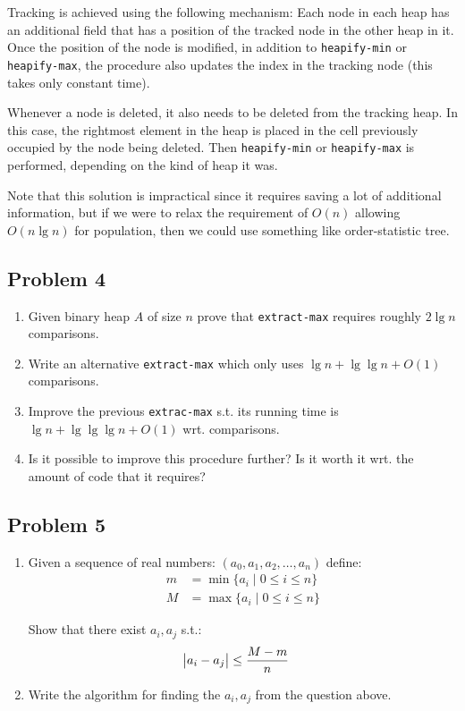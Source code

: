 \documentclass[11pt]{article}
\begin{document}
Tracking is achieved using the following mechanism: Each node in each heap
has an additional field that has a position of the tracked node in the other
heap in it.  Once the position of the node is modified, in addition to
\texttt{heapify-min} or \texttt{heapify-max}, the procedure also updates the index in the
tracking node (this takes only constant time).

Whenever a node is deleted, it also needs to be deleted from the tracking
heap.  In this case, the rightmost element in the heap is placed in the cell
previously occupied by the node being deleted.  Then \texttt{heapify-min} or
\texttt{heapify-max} is performed, depending on the kind of heap it was.

Note that this solution is impractical since it requires saving a lot of
additional information, but if we were to relax the requirement of \(O(n)\)
allowing \(O(n \lg n)\) for population, then we could use something like
order-statistic tree.

\subsection{Problem 4}
\label{sec:orgheadline5}
\begin{enumerate}
\item Given binary heap \(A\) of size \(n\) prove that \texttt{extract-max} requires
roughly \(2\lg n\) comparisons.
\item Write an alternative \texttt{extract-max} which only uses \(\lg n + \lg \lg n +
      O(1)\) comparisons.
\item Improve the previous \texttt{extrac-max} s.t. its running time is \(\lg n + \lg
      \lg \lg n + O(1)\) wrt. comparisons.
\item Is it possible to improve this procedure further?  Is it worth it wrt. the
amount of code that it requires?
\end{enumerate}

\subsection{Problem 5}
\label{sec:orgheadline8}
\begin{enumerate}
\item Given a sequence of real numbers: \((a_0, a_1, a_2, \dots, a_n)\) define:
\begin{align*}
  m &= \min\{a_i\;|\; 0 \leq i \leq n\} \\
  M &= \max\{a_i\;|\; 0 \leq i \leq n\}
\end{align*}

Show that there exist \(a_i, a_j\) s.t.:
\begin{align*}
  \abs{a_i - a_j} &\leq \frac{M - m}{n}
\end{align*}

\item Write the algorithm for finding the \(a_i, a_j\) from the question above.
\end{enumerate}
\end{document}
